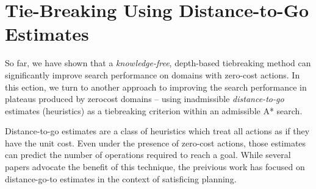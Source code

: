 \clearpage
\section{Tie-Breaking Using Distance-to-Go Estimates}

\label{sec:distance-to-go}

So far, we have shown that a {\it knowledge-free}, depth-based tiebreaking method can significantly improve search performance on domains with zero-cost actions.
In this ection, we turn to another approach to improving the
search performance in plateaus produced by zerocost domains --
using inadmissible \emph{distance-to-go} estimates (heuristics) as a tiebreaking criterion within an admissible A* search.



Distance-to-go estimates are a class of
heuristics which treat all actions as if they have the unit cost. Even under
the presence of zero-cost actions, those estimates can predict the
number of operations required to reach a goal.
While several papers advocate the benefit of this technique, the preivious work has focused on 
distance-go-to estimates in the context of satisficing planning.

